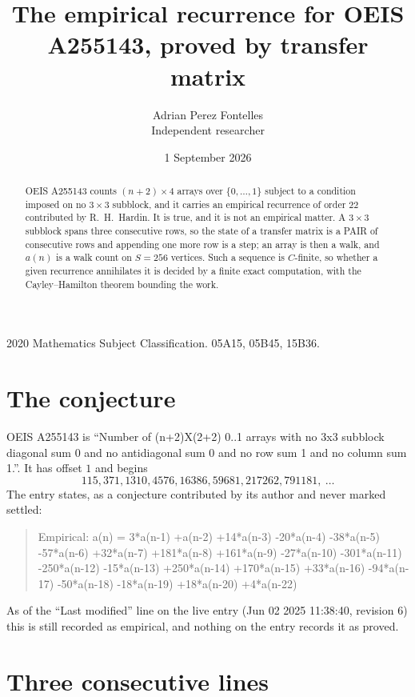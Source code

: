 \documentclass[11pt,a4paper]{article}
\title{The empirical recurrence for OEIS A255143, proved by transfer matrix}
\author{Adrian Perez Fontelles\\ \small Independent researcher}
\date{1 September 2026}
\theoremstyle{plain}
\theoremstyle{definition}
\begin{document}
\maketitle

\begin{abstract}
OEIS A255143 counts $(n+2)\times4$ arrays over $\{0,\dots,1\}$ subject to a condition imposed on
no $3\times3$ subblock, and it carries an empirical recurrence of order $22$
contributed by R.~H.~Hardin. It is true, and it is not an empirical matter. A $3\times3$
subblock spans three consecutive rows, so the state of a transfer matrix is a PAIR of
consecutive rows and appending one more row is a step; an array is then a walk, and
$a(n)$ is a walk count on $S=256$ vertices. Such a sequence is $C$-finite, so whether a given
recurrence annihilates it is decided by a finite exact computation, with the Cayley--Hamilton
theorem bounding the work.
\end{abstract}

\noindent\small 2020 Mathematics Subject Classification. 05A15, 05B45, 15B36.\normalsize

\section{The conjecture}

OEIS A255143 is ``Number of (n+2)X(2+2) 0..1 arrays with no 3x3 subblock diagonal sum 0 and no antidiagonal sum 0 and no row sum 1 and no column sum 1.''. It has offset $1$ and begins
\[
115, 371, 1310, 4576, 16386, 59681, 217262, 791181,\ \dots
\]
The entry states, as a conjecture contributed by its author and never marked settled:
\begin{quote}
Empirical: a(n) = 3*a(n-1) +a(n-2) +14*a(n-3) -20*a(n-4) -38*a(n-5) -57*a(n-6) +32*a(n-7) +181*a(n-8) +161*a(n-9) -27*a(n-10) -301*a(n-11) -250*a(n-12) -15*a(n-13) +250*a(n-14) +170*a(n-15) +33*a(n-16) -94*a(n-17) -50*a(n-18) -18*a(n-19) +18*a(n-20) +4*a(n-22)
\end{quote}
As of the ``Last modified'' line on the live entry (Jun 02 2025 11:38:40, revision 6) this is still
recorded as empirical, and nothing on the entry records it as proved.

\section{Three consecutive lines}
\end{document}
